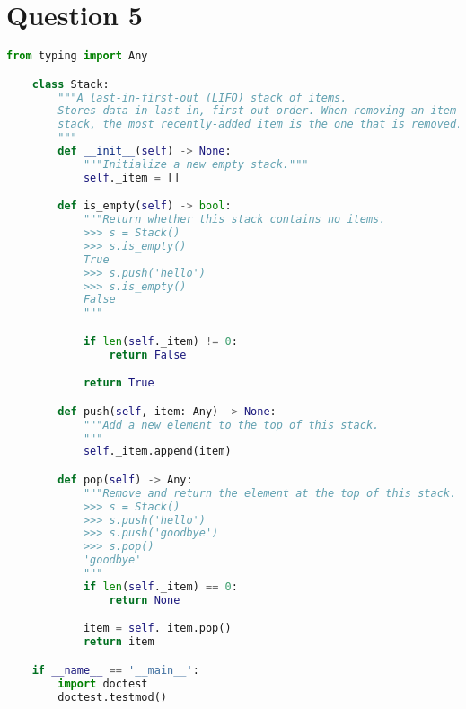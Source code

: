 \documentclass[12pt]{article}
\begin{document}
\section*{Question 5}

\begin{lstlisting}[language=Python,caption={worksheet\_8\_solution.py},captionpos=b]
    from typing import Any

    class Stack:
        """A last-in-first-out (LIFO) stack of items.
        Stores data in last-in, first-out order. When removing an item from the
        stack, the most recently-added item is the one that is removed.
        """
        def __init__(self) -> None:
            """Initialize a new empty stack."""
            self._item = []

        def is_empty(self) -> bool:
            """Return whether this stack contains no items.
            >>> s = Stack()
            >>> s.is_empty()
            True
            >>> s.push('hello')
            >>> s.is_empty()
            False
            """

            if len(self._item) != 0:
                return False

            return True

        def push(self, item: Any) -> None:
            """Add a new element to the top of this stack.
            """
            self._item.append(item)

        def pop(self) -> Any:
            """Remove and return the element at the top of this stack.
            >>> s = Stack()
            >>> s.push('hello')
            >>> s.push('goodbye')
            >>> s.pop()
            'goodbye'
            """
            if len(self._item) == 0:
                return None

            item = self._item.pop()
            return item

    if __name__ == '__main__':
        import doctest
        doctest.testmod()
\end{lstlisting}
\end{document}
